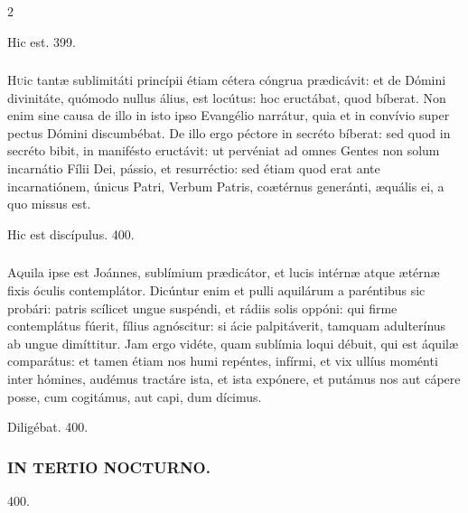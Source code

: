\documentclass[9pt,twoside]{extarticle}
\begin{document}
\begin{multicols}{2}
\begin{tightlist}{}
\item {} Hic est. 399.
\end{tightlist}

\subsubsection*{\center {}}
\lettrine{H}uic tantæ sublimitáti princípii étiam cétera cóngrua prædicávit: et de Dómini divinitáte, quómodo nullus álius, est locútus: hoc eructábat, quod bíberat. Non enim sine causa de illo in isto ipso Evangélio narrátur, quia et in convívio super pectus Dómini discumbébat. De illo ergo péctore in secréto bíberat: sed quod in secréto bibit, in manifésto eructávit: ut pervéniat ad omnes Gentes non solum incarnátio Fílii Dei, pássio, et resurréctio: sed étiam quod erat ante incarnatiónem, únicus Patri, Verbum Patris, coætérnus generánti, æquális ei, a quo missus est.

\begin{tightlist}{}
\item {} Hic est discípulus. 400.
\end{tightlist}

\subsubsection*{\center {}}
\lettrine{A}quila ipse est Joánnes, sublímium prædicátor, et lucis intérnæ atque ætérnæ fixis óculis contemplátor. Dicúntur enim et pulli aquilárum a paréntibus sic probári: patris scílicet ungue suspéndi, et rádiis solis oppóni: qui firme contemplátus fúerit, fílius agnóscitur: si ácie palpitáverit, tamquam adulterínus ab ungue dimíttitur. Jam ergo vidéte, quam sublímia loqui débuit, qui est áquilæ comparátus: et tamen étiam nos humi repéntes, infírmi, et vix ullíus moménti inter hómines, audémus tractáre ista, et ista expónere, et putámus nos aut cápere posse, cum cogitámus, aut capi, dum dícimus.

\begin{tightlist}{}
\item {} Diligébat. 400.
\end{tightlist}

\subsubsection*{\center \textsc{IN TERTIO NOCTURNO.}}
\begin{tightlist}{}
\item {} 400.
\end{tightlist}


\end{multicols}
\end{document}
